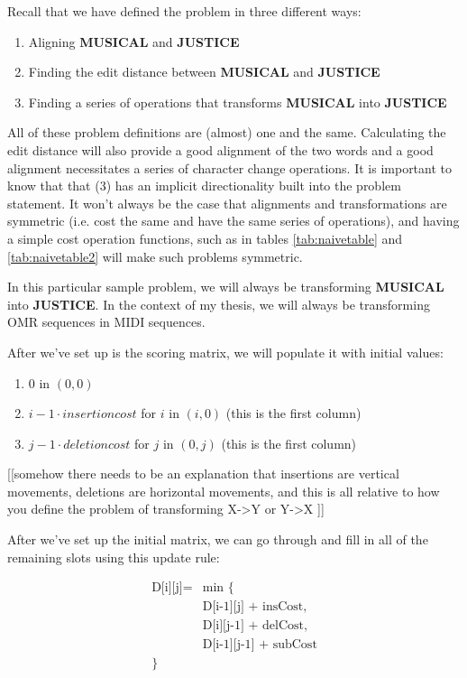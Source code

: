 Recall that we have defined the problem in three different ways:
\begin{enumerate}
\item Aligning \textbf{MUSICAL} and \textbf{JUSTICE}
\item Finding the edit distance between \textbf{MUSICAL} and \textbf{JUSTICE}
\item Finding a series of operations that transforms \textbf{MUSICAL} into \textbf{JUSTICE}
\end{enumerate}

All of these problem definitions are (almost) one and the same. Calculating the edit distance will also provide a good alignment of the two words and a good alignment necessitates a series of character change operations. It is important to know that that (3) has an implicit directionality built into the problem statement. It won't always be the case that alignments and transformations are symmetric (i.e. cost the same and have the same series of operations), and having a simple cost operation functions, such as in tables 
\ref{tab:naivetable}
 and 
 \ref{tab:naivetable2} 
 will make such problems symmetric. 

In this particular sample problem, we will always be transforming \textbf{MUSICAL} into \textbf{JUSTICE}. In the context of my thesis, we will always be transforming OMR sequences in MIDI sequences. 

After we've set up is the scoring matrix, we will populate it with initial values: 
\begin{enumerate}
\item 0 in $(0,0)$
\item $i-1 \cdot insertion cost$ for $i$ in $(i, 0)$ (this is the first column) 
\item $j-1 \cdot deletion cost$ for $j$ in $(0, j)$ (this is the first column) 
\end{enumerate}
[[somehow there needs to be an explanation that insertions are vertical movements, deletions are horizontal movements, and this is all relative to how you define the problem of transforming X->Y or Y->X ]]

After we've set up the initial matrix, we can go through and fill in all of the remaining slots using this update rule:


\begin{equation*}
\begin{split}
\text{D[i][j]} = &  \text{min \{ }\\
& \text{D[i-1][j] + insCost,} \\
& \text{D[i][j-1] + delCost,} \\
& \text{D[i-1][j-1] + subCost} \\
\text{\}}
\end{split}
\end{equation*}


